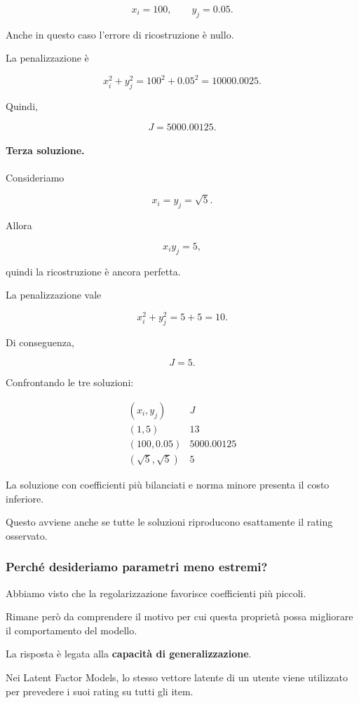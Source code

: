 \[
x_i=100,
\qquad
y_j=0.05.
\]

Anche in questo caso l'errore di ricostruzione è nullo.

La penalizzazione è

\[
x_i^2+y_j^2
=
100^2+0.05^2
=
10000.0025.
\]

Quindi,

\[
J=5000.00125.
\]

\paragraph{Terza soluzione.}

Consideriamo

\[
x_i=y_j=\sqrt{5}.
\]

Allora

\[
x_i y_j=5,
\]

quindi la ricostruzione è ancora perfetta.

La penalizzazione vale

\[
x_i^2+y_j^2=5+5=10.
\]

Di conseguenza,

\[
J=5.
\]

Confrontando le tre soluzioni:

\[
\begin{array}{c|c}
(x_i,y_j) & J\\
\hline
(1,5) & 13\\
(100,0.05) & 5000.00125\\
(\sqrt{5},\sqrt{5}) & 5
\end{array}
\]

La soluzione con coefficienti più bilanciati
e norma minore presenta il costo inferiore.

Questo avviene anche se tutte le soluzioni
riproducono esattamente il rating osservato.

\subsubsection{Perché desideriamo parametri meno estremi?}

Abbiamo visto che la regolarizzazione favorisce
coefficienti più piccoli.

Rimane però da comprendere il motivo per cui
questa proprietà possa migliorare il comportamento
del modello.

La risposta è legata alla
\textbf{capacità di generalizzazione}.

Nei Latent Factor Models, lo stesso vettore latente
di un utente viene utilizzato per prevedere
i suoi rating su tutti gli item.

